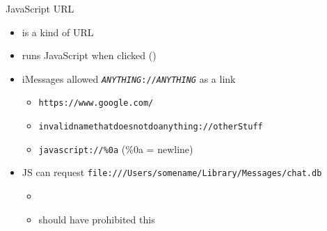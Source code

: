 \begin{frame}{JavaScript URL}
    \begin{itemize}
        \item {} is a kind of URL
        \item runs JavaScript when clicked ()
        \item iMessages allowed \texttt{\textit{ANYTHING}://\textit{ANYTHING}} as a link
            \begin{itemize}
            \item \texttt{https://www.google.com/}
            \item \texttt{invalidnamethatdoesnotdoanything://otherStuff}
            \item \texttt{javascript://\%0a} (\%0a = newline)
            \end{itemize}
        \item JS can request \fontsize{11}{12}\texttt{file:///Users/somename/Library/Messages/chat.db}
            \begin{itemize}
                \item {}
                \item should have prohibited this
            \end{itemize}
    \end{itemize}
\end{frame}

